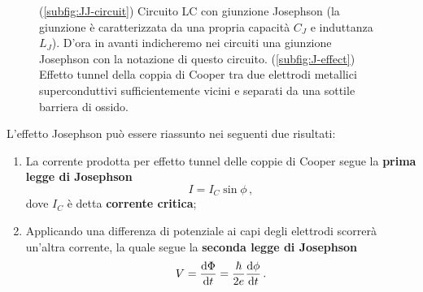 \begin{figure}[!ht]
	\centering	
	 \qquad
	\caption{(\ref{subfig:JJ-circuit}) Circuito LC con giunzione Josephson (la giunzione è caratterizzata da una propria capacità $C_J$ e induttanza $L_J$). D'ora in avanti indicheremo nei circuiti una giunzione Josephson con la notazione di questo circuito. (\ref{subfig:J-effect}) Effetto tunnel della coppia di Cooper tra due elettrodi metallici superconduttivi sufficientemente vicini e separati da una sottile barriera di ossido.}
\end{figure}
\noindent L'effetto Josephson può essere riassunto nei seguenti due risultati:
\begin{enumerate}
    \item La corrente prodotta per effetto tunnel delle coppie di Cooper segue la \textbf{prima legge di Josephson}
    \begin{equation}\label{1_Josephson_law}
        I = I_C \sin \phi \, ,
    \end{equation}
    dove $I_C$ è detta \textbf{corrente critica};
    
    \item Applicando una differenza di potenziale ai capi degli elettrodi scorrerà un'altra corrente, la quale segue la \textbf{seconda legge di Josephson}
    \begin{equation}\label{2_Josephson_law}
        V = \dv{\Phi}{t} = \frac{\hbar}{2 e} \dv{\phi}{t} \, .
    \end{equation}
\end{enumerate}
